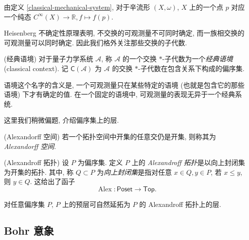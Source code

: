 \begin{example}
	{}
	由定义 \ref{classical-mechanical-system}, 对于辛流形 $(X,\omega)$, $X$ 上的一个点 $p$ 对应一个纯态 $C^\infty (X)\to\mathbb{R},f\mapsto f(p)$.
\end{example}

Heisenberg 不确定性原理表明, 不交换的可观测量不可同时确定, 而一族相交换的可观测量可以同时确定. 因此我们格外关注那些交换的子代数.

\begin{definition}
    {(经典语境)}
    对于量子力学系统 $\mathcal A$, 称 $\mathcal A$ 的一个交换 $*$-子代数为一个\emph{经典语境} (classical context).
    记 $\mathsf C(\mathcal A)$ 为 $\mathcal A$ 的交换 $*$-子代数在包含关系下构成的偏序集.
\end{definition}

\begin{remark}
    {}
    语境这个名字的含义是, 一个可观测量只在某些特定的语境 (也就是包含它的那些语境) 下才有确定的值. 在一个固定的语境中, 可观测量的表现无异于一个经典系统.
\end{remark}

这里我们稍微偏题, 介绍偏序集上的层.


\begin{definition}
    {(Alexandorff 空间)}
    若一个拓扑空间中开集的任意交仍是开集, 则称其为 \emph{Alexandorff 空间}.
\end{definition}

\begin{definition}
    {(Alexandroff 拓扑)}
    设 $P$ 为偏序集. 定义 $P$ 上的 \emph{Alexandroff 拓扑}是以向上封闭集为开集的拓扑. 其中, 称 $Q\subset P$ 为\emph{向上封闭集}是指对任意 $x\in Q,y\in P$, 若 $x\leq y$, 则 $y\in Q$. 这给出了函子
    \[
    \operatorname{Alex}\colon \mathsf {Poset} \to \mathsf {Top}.
    \]
\end{definition}

\begin{prop}
    {}
    对任意偏序集 $P$, $P$ 上的预层可自然延拓为 $P$ 的 Alexandroff 拓扑上的层.
\end{prop}

%

\subsection{Bohr 意象}

